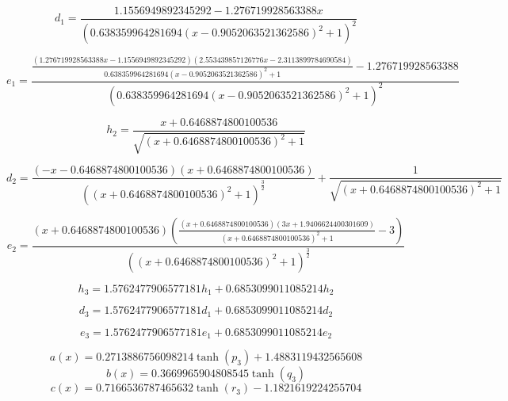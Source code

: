 \begin{equation}
d_{1}=\frac{1.1556949892345292 - 1.276719928563388 x}{\left(0.638359964281694 \left(x - 0.9052063521362586\right)^{2} + 1\right)^{2}}
\end{equation}


\begin{equation}
e_{1}=\frac{\frac{\left(1.276719928563388 x - 1.1556949892345292\right) \left(2.553439857126776 x - 2.3113899784690584\right)}{0.638359964281694 \left(x - 0.9052063521362586\right)^{2} + 1} - 1.276719928563388}{\left(0.638359964281694 \left(x - 0.9052063521362586\right)^{2} + 1\right)^{2}}
\end{equation}


\begin{equation}
h_{2}=\frac{x + 0.6468874800100536}{\sqrt{\left(x + 0.6468874800100536\right)^{2} + 1}}
\end{equation}


\begin{equation}
d_{2}=\frac{\left(- x - 0.6468874800100536\right) \left(x + 0.6468874800100536\right)}{\left(\left(x + 0.6468874800100536\right)^{2} + 1\right)^{\frac{3}{2}}} + \frac{1}{\sqrt{\left(x + 0.6468874800100536\right)^{2} + 1}}
\end{equation}


\begin{equation}
e_{2}=\frac{\left(x + 0.6468874800100536\right) \left(\frac{\left(x + 0.6468874800100536\right) \left(3 x + 1.9406624400301609\right)}{\left(x + 0.6468874800100536\right)^{2} + 1} - 3\right)}{\left(\left(x + 0.6468874800100536\right)^{2} + 1\right)^{\frac{3}{2}}}
\end{equation}


\begin{equation}
h_{3}=1.5762477906577181 h_{1} + 0.6853099011085214 h_{2}
\end{equation}


\begin{equation}
d_{3}=1.5762477906577181 d_{1} + 0.6853099011085214 d_{2}
\end{equation}


\begin{equation}
e_{3}=1.5762477906577181 e_{1} + 0.6853099011085214 e_{2}
\end{equation}


\begin{equation}
a(x)=0.2713886756098214 \tanh{\left(p_{3} \right)} + 1.4883119432565608
\end{equation}
\begin{equation}
b(x)=0.3669965904808545 \tanh{\left(q_{3} \right)}
\end{equation}
\begin{equation}
c(x)=0.7166536787465632 \tanh{\left(r_{3} \right)} - 1.1821619224255704
\end{equation}


